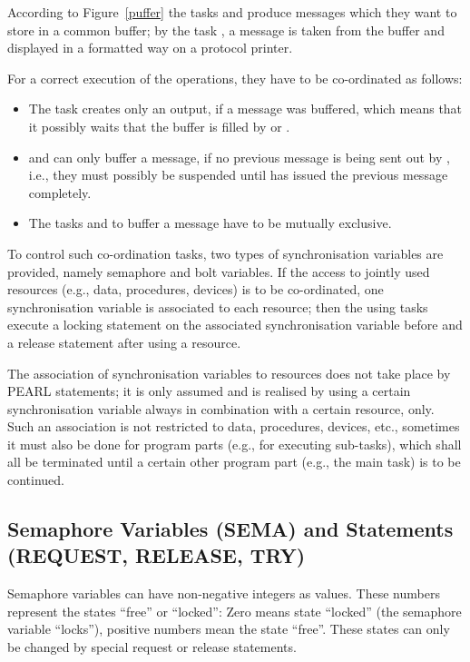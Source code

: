 According to Figure~\ref{puffer} the tasks  and 
 produce messages which they want to
store in a common buffer; by the task , a message is taken from
the buffer and displayed in a formatted way on a protocol printer.

For a correct execution of the operations, they have to be co-ordinated
as follows:
\begin{itemize}
\item The task  creates only an output, if a message was buffered, which
means that it possibly waits that the buffer is filled by  or
.
\item {} and  can only buffer a message, if no
previous message is being sent out by , i.e., they must possibly
be suspended until  has issued the previous message completely.
\item The tasks  and  to buffer a
message have to be mutually exclusive.
\end{itemize}

To control such co-ordination tasks, two types of synchronisation
variables are provided, namely semaphore and bolt variables. If the
access to jointly used resources (e.g., data, procedures, devices) is to
be co-ordinated, one synchronisation variable is associated to each
resource; then the using tasks execute a locking statement on the
associated synchronisation variable before and a release statement
after using a resource.

The association of synchronisation variables to resources does not take
place by PEARL statements; it is only assumed and is realised by using a
certain synchronisation variable always in combination with a certain
resource, only. Such an association is not restricted to data,
procedures, devices, etc., sometimes it must also be done for program
parts (e.g., for executing sub-tasks), which shall all be
terminated until a certain other program part (e.g., the main task) is to be
continued.

\subsection{Semaphore Variables (SEMA) and Statements (REQUEST,
RELEASE, TRY)} %
\label{sec_semaphores}


Semaphore variables can have non-negative integers as values. These
numbers represent the states ``free'' or ``locked'': Zero means state
``locked'' (the semaphore variable ``locks''), positive numbers mean the
state ``free''.  These states can only be changed by special request or
release statements.

